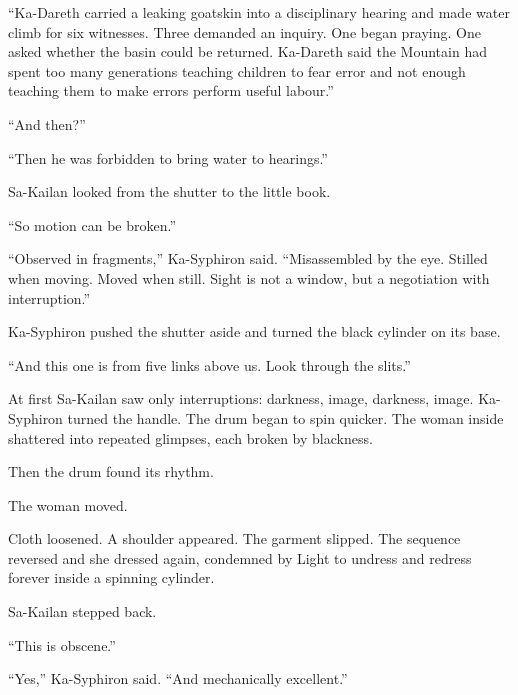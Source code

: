 “Ka-Dareth carried a leaking goatskin into a disciplinary hearing and made water climb for six witnesses.
Three demanded an inquiry.
One began praying.
One asked whether the basin could be returned.
Ka-Dareth said the Mountain had spent too many generations teaching children to fear error and not enough teaching them to make errors perform useful labour.”\par

“And then?”\par

“Then he was forbidden to bring water to hearings.”\par

Sa-Kailan looked from the shutter to the little book.\par

“So motion can be broken.”\par

“Observed in fragments,” Ka-Syphiron said.
“Misassembled by the eye.
Stilled when moving.
Moved when still.
Sight is not a window, but a negotiation with interruption.”\par




Ka-Syphiron pushed the shutter aside and turned the black cylinder on its base.\par

“And this one is from five links above us.
Look through the slits.”\par

At first Sa-Kailan saw only interruptions: darkness, image, darkness, image.
Ka-Syphiron turned the handle.
The drum began to spin quicker.
The woman inside shattered into repeated glimpses, each broken by blackness.\par

Then the drum found its rhythm.\par

The woman moved.\par

Cloth loosened.
A shoulder appeared.
The garment slipped.
The sequence reversed and she dressed again, condemned by Light to undress and redress forever inside a spinning cylinder.\par

Sa-Kailan stepped back.\par

“This is obscene.”\par

“Yes,” Ka-Syphiron said.
“And mechanically excellent.”\par

